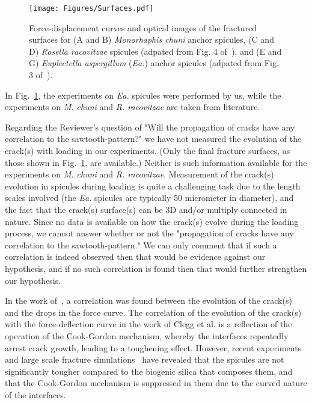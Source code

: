 \documentclass[11pt,letterpaper]{report}
\begin{document}
\begin{enumerate}[label=\textit{1.\arabic*},wide, labelwidth=!, labelindent=0pt]
\begin{enumerate}[label=\textit{2.\arabic*},wide, labelindent=0pt]
\begin{figure}[H]
\centering
\texttt{[image: Figures/Surfaces.pdf]}
\caption{Force-displacement curves and optical images of the fractured surfaces for (A and B) \textit{Monorhaphis chuni} anchor spicules, (C and D) \textit{Rosella racovitzae} spicules (adpated from Fig. 4 of~\citet{kochiyama2021sawtooth}), and (E and G) \textit{Euplectella aspergillum} (\textit{Ea.}) anchor spicules (adpated from Fig. 3 of~\citet{monn2017enhanced}).
}
\label{fig:Surfaces}
\end{figure}

In Fig.~\ref{fig:Surfaces}, the experiments on \textit{Ea.} spicules were performed by us, while the experiments on \textit{M. chuni} and \textit{R. racovitzae} are taken from literature.


Regarding the Reviewer's question of "Will the propagation of cracks have any correlation to the sawtooth-pattern?" we have not measured the evolution of the crack(s) with loading in our experiments. (Only the final fracture surfaces, as those shown in Fig.~\ref{fig:Surfaces}, are available.) Neither is such  information available for the experiments on \textit{M. chuni} and \textit{R. racovitzae}. Measurement of the crack(s) evolution in spicules during loading is quite a challenging task due to the length scales involved (the \textit{Ea.} spicules are typically 50 micrometer in diameter), and the fact that the crack(s) surface(s) can be 3D and/or multiply connected in nature. Since no data is available on how the crack(s) evolve during the loading process, we cannot answer whether or not the "propagation of cracks have any correlation to the sawtooth-pattern." We can only comment that if such a correlation is indeed observed then that would be evidence against our hypothesis, and if no such correlation is found then that would further strengthen our hypothesis.

In the work of~\citet{clegg1990simple}, a correlation was found between the evolution of the crack(s) and the drops in the force curve. The correlation of the evolution of the crack(s) with the force-deflection curve in the work of Clegg et al. is a reflection of the operation of the Cook-Gordon mechanism, whereby the interfaces repeatedly arrest crack growth, leading to a toughening effect. However, recent experiments and large scale fracture simulations~\cite{monn2020lamellar} have revealed that the  spicules are not significantly tougher compared to the biogenic silica that composes them, and that the Cook-Gordon mechanism is suppressed in them due to the curved nature of the interfaces.


\end{enumerate}
\end{enumerate}
\end{document}
